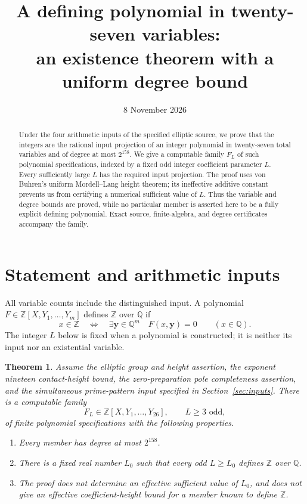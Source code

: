 \documentclass[11pt,a4paper]{article}
\title{A defining polynomial in twenty-seven variables:\\
an existence theorem with a uniform degree bound}
\author{}\date{8 November 2026}
\newtheorem{theorem}{Theorem}\newtheorem{lemma}[theorem]{Lemma}
\newcommand{\Q}{\mathbb Q}\newcommand{\Z}{\mathbb Z}
\begin{document}
\maketitle
\begin{abstract}
Under the four arithmetic inputs of the specified elliptic source,
we prove that the integers are the rational input projection of an
integer polynomial in twenty-seven total variables and of degree
at most $2^{158}$. We give a computable family $F_L$ of such
polynomial specifications, indexed by a fixed odd integer coefficient
parameter $L$. Every sufficiently large $L$ has the required input
projection. The proof uses von Buhren's uniform Mordell--Lang
height theorem; its ineffective additive constant prevents us from
certifying a numerical sufficient value of $L$. Thus the variable
and degree bounds are proved, while no particular member is asserted
here to be a fully explicit defining polynomial. Exact source,
finite-algebra, and degree certificates accompany the family.
\end{abstract}

\section{Statement and arithmetic inputs}

All variable counts include the distinguished input. A polynomial
$F\in\Z[X,Y_1,\ldots,Y_m]$ defines $\Z$ over $\Q$ if
\[
 x\in\Z\quad\Longleftrightarrow\quad
 \exists\mathbf y\in\Q^m\quad F(x,\mathbf y)=0
 \qquad(x\in\Q).
\]
The integer $L$ below is fixed when a polynomial is constructed;
it is neither its input nor an existential variable.

\begin{theorem}\label{thm:main}
Assume the elliptic group and height assertion, the exponent
nineteen contact-height bound, the zero-preparation pole
completeness assertion, and the simultaneous prime-pattern input
specified in Section~\ref{sec:inputs}. There is a computable
family
\[
 F_L\in\Z[X,Y_1,\ldots,Y_{26}],\qquad
 L\ge3\text{ odd},
\]
of finite polynomial specifications with the following properties.
\begin{enumerate}
\item Every member has degree at most $2^{158}$.
\item There is a fixed real number $L_0$ such that every odd
      $L\ge L_0$ defines $\Z$ over $\Q$.
\item The proof does not determine an effective sufficient
      value of $L_0$, and does not give an effective
      coefficient-height bound for a member known to define $\Z$.
\end{enumerate}
\end{theorem}
\end{document}
